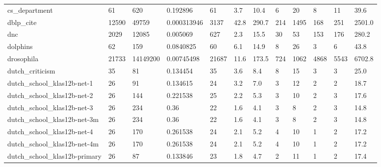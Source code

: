 \begin{longtable}{llllllllllll}
 cs\_department                                      & 61         & 620       & 0.192896    & 61    & 3.7    & 10.4   & 6     & 20     & 8      & 11     & 39.6    \\
 dblp\_cite                                          & 12590      & 49759     & 0.000313946 & 3137  & 42.8   & 290.7  & 214   & 1495   & 168    & 251    & 2501.0  \\
 dnc                                                & 2029       & 12085     & 0.005069    & 627   & 2.3    & 15.5   & 30    & 53     & 153    & 176    & 280.2   \\
 dolphins                                           & 62         & 159       & 0.0840825   & 60    & 6.1    & 14.9   & 8     & 26     & 3      & 6      & 43.8    \\
 drosophila                                         & 21733      & 14149200  & 0.00745498  & 21687 & 11.6   & 173.5  & 724   & 1062   & 4868   & 5543   & 6702.8  \\
 dutch\_criticism                                    & 35         & 81        & 0.134454    & 35    & 3.6    & 8.4    & 8     & 15     & 3      & 3      & 25.0    \\
 dutch\_school\_klas12b-net-1                         & 26         & 91        & 0.134615    & 24    & 3.2    & 7.0    & 3     & 12     & 2      & 2      & 18.7    \\
 dutch\_school\_klas12b-net-2                         & 26         & 144       & 0.221538    & 25    & 2.2    & 5.3    & 3     & 10     & 2      & 3      & 17.6    \\
 dutch\_school\_klas12b-net-3                         & 26         & 234       & 0.36        & 22    & 1.6    & 4.1    & 3     & 8      & 2      & 3      & 14.8    \\
 dutch\_school\_klas12b-net-3m                        & 26         & 234       & 0.36        & 22    & 1.6    & 4.1    & 3     & 8      & 2      & 3      & 14.8    \\
 dutch\_school\_klas12b-net-4                         & 26         & 170       & 0.261538    & 24    & 2.1    & 5.2    & 4     & 10     & 1      & 2      & 17.2    \\
 dutch\_school\_klas12b-net-4m                        & 26         & 170       & 0.261538    & 24    & 2.1    & 5.2    & 4     & 10     & 1      & 2      & 17.2    \\
 dutch\_school\_klas12b-primary                       & 26         & 87        & 0.133846    & 23    & 1.8    & 4.7    & 2     & 11     & 1      & 2      & 17.4    \\

\end{longtable}
